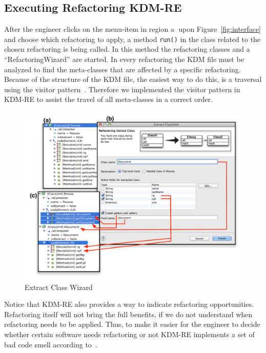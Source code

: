 \subsection{Executing Refactoring KDM-RE}

After the engineer clicks on the menu-item in region \textcircled{a} upon Figure~\ref{fig:interface} and choose which refactoring to apply, a method \texttt{run()} in the class related to the chosen refactoring is being called. In this method the refactoring classes and a ``RefactoringWizard'' are started. In every refactoring the KDM file must be analyzed to find the meta-classes that are affected by a specific refactoring. Because of the structure of the KDM file, the easiest way to do this, is a traversal using the visitor pattern~\cite{Gamma1994}. Therefore we implemented the visitor pattern in KDM-RE to assist the travel of all meta-classes in a correct order.

\begin{figure}[!ht]
\centering
  \includegraphics[scale=0.6]{figure/Wizard2}
\caption{Extract Class Wizard}
\label{fig:wizard}
\end{figure}

Notice that KDM-RE also provides a way to indicate refactoring opportunities. Refactoring itself will not bring the full benefits, if we do not understand when refactoring needs to be applied. Thus, to make it easier for the engineer to decide whether certain software needs refactoring or 
not KDM-RE implements a set of bad code smell according to~\cite{bad_smeel_}.

